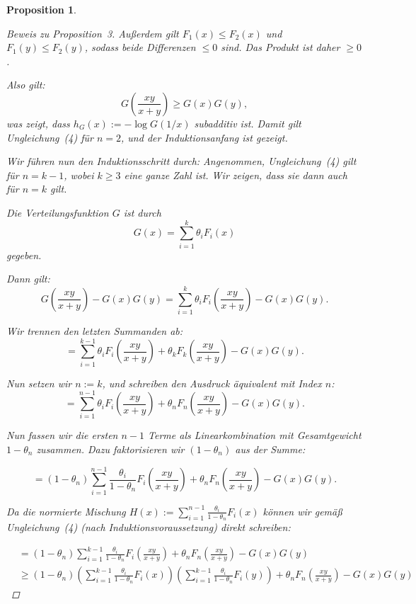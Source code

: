 \documentclass[
12pt,
fancyheadings, %
%
a4paper, 
%
]{tuhhreprt}
\newtheorem{proposition}[definition]{Proposition}
\begin{document}
\begin{proposition}
\begin{proof}[Beweis zu Proposition~3]
Außerdem gilt \( F_1(x) \leq F_2(x) \) und \( F_1(y) \leq F_2(y) \), sodass beide Differenzen \( \leq 0 \) sind.  
Das Produkt ist daher \( \geq 0 \).


Also gilt:
\[
G\left( \frac{xy}{x + y} \right) \geq G(x) G(y),
\]
was zeigt, dass \( h_G(x) := -\log G(1/x) \) subadditiv ist.  
Damit gilt Ungleichung~(4) für \( n = 2 \), und der Induktionsanfang ist gezeigt.

\medskip

Wir führen nun den Induktionsschritt durch:  
Angenommen, Ungleichung~(4) gilt für \( n = k - 1 \), wobei \( k \geq 3 \) eine ganze Zahl ist.  
Wir zeigen, dass sie dann auch für \( n = k \) gilt.

Die Verteilungsfunktion \( G \) ist durch
\[
G(x) = \sum_{i=1}^{k} \theta_i F_i(x)
\]
gegeben.

Dann gilt:
\[
G\left( \frac{xy}{x + y} \right) - G(x) G(y)
= \sum_{i=1}^{k} \theta_i F_i\left( \frac{xy}{x + y} \right) - G(x) G(y).
\]

Wir trennen den letzten Summanden ab:
\[
= \sum_{i=1}^{k-1} \theta_i F_i\left( \frac{xy}{x + y} \right) + \theta_k F_k\left( \frac{xy}{x + y} \right) - G(x) G(y).
\]

Nun setzen wir \( n := k \), und schreiben den Ausdruck äquivalent mit Index \( n \):
\[
= \sum_{i=1}^{n-1} \theta_i F_i\left( \frac{xy}{x + y} \right) + \theta_n F_n\left( \frac{xy}{x + y} \right) - G(x) G(y).
\]

Nun fassen wir die ersten \( n - 1 \) Terme als Linearkombination mit Gesamtgewicht \( 1 - \theta_n \) zusammen.  
Dazu faktorisieren wir \( (1 - \theta_n) \) aus der Summe:

\[
= (1 - \theta_n) \sum_{i=1}^{n-1} \frac{\theta_i}{1 - \theta_n} F_i\left( \frac{xy}{x + y} \right)
+ \theta_n F_n\left( \frac{xy}{x + y} \right) - G(x) G(y).
\]

Da die normierte Mischung \( H(x) := \sum_{i=1}^{n-1} \frac{\theta_i}{1 - \theta_n} F_i(x) \)
können wir gemäß Ungleichung~(4) (nach Induktionsvoraussetzung) direkt schreiben:

\begin{align*}
&= (1 - \theta_n) \sum_{i=1}^{k-1} \frac{\theta_i}{1 - \theta_n} F_i\left( \frac{xy}{x + y} \right)
+ \theta_n F_n\left( \frac{xy}{x + y} \right) - G(x) G(y) \\
&\geq (1 - \theta_n)
\left( \sum_{i=1}^{k-1} \frac{\theta_i}{1 - \theta_n} F_i(x) \right)
\left( \sum_{i=1}^{k-1} \frac{\theta_i}{1 - \theta_n} F_i(y) \right)
+ \theta_n F_n\left( \frac{xy}{x + y} \right) - G(x) G(y)
\end{align*}


\end{proof}
\end{proposition}
\end{document}

